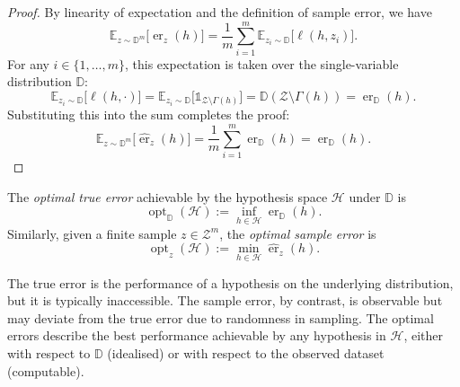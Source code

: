 \begin{proof}

    By linearity of expectation and the definition of sample error, we have
    \[
        \mathbb{E}_{z\sim\mathbb{D}^m}\bigl[\hat{\operatorname{er}}_{z}(h)\bigr] = \frac{1}{m}\sum_{i=1}^m \mathbb{E}_{z_i\sim\mathbb{D}}\bigl[\ell(h,z_i)\bigr].
    \]
    For any $i \in \{1, \dots, m\}$, this expectation is taken over the single-variable distribution $\mathbb{D}$:
    \[
        \mathbb{E}_{z_i\sim\mathbb{D}}\bigl[\ell(h,\cdot)\bigr] = \mathbb{E}_{z_i\sim\mathbb{D}}\bigl[\mathds{1}_{\mathcal{Z}\setminus\Gamma(h)}\bigr] = \mathbb{D}(\mathcal{Z}\setminus\Gamma(h))=\operatorname{er}_{\mathbb{D}}(h).
    \]
    Substituting this into the sum completes the proof:
    \[
        \mathbb{E}_{z\sim\mathbb{D}^m}\bigl[\hat{\operatorname{er}}_{z}(h)\bigr] = \frac{1}{m}\sum_{i=1}^m \operatorname{er}_{\mathbb{D}}(h) = \operatorname{er}_{\mathbb{D}}(h).
    \]
    \qedhere
\end{proof}

\begin{definition}
    The \emph{optimal true error} achievable by the hypothesis space $\mathcal{H}$ under $\mathbb{D}$ is
    \[
        \operatorname{opt}_{\mathbb{D}}(\mathcal{H}) := \inf_{h\in\mathcal{H}} \operatorname{er}_{\mathbb{D}}(h).
    \]
    Similarly, given a finite sample $z \in \mathcal{Z}^m$, the \emph{optimal sample error} is
    \[
        \operatorname{opt}_{z}(\mathcal{H}) := \min_{h\in\mathcal{H}} \hat{\operatorname{er}}_{z}(h).
    \]
\end{definition}

\medskip

The true error is the performance of a hypothesis on the underlying distribution, but it is typically inaccessible.
The sample error, by contrast, is observable but may deviate from the true error due to randomness in sampling.
The optimal errors describe the best performance achievable by any hypothesis in $\mathcal{H}$, either with respect to $\mathbb{D}$ (idealised) or with respect to the observed dataset (computable).

